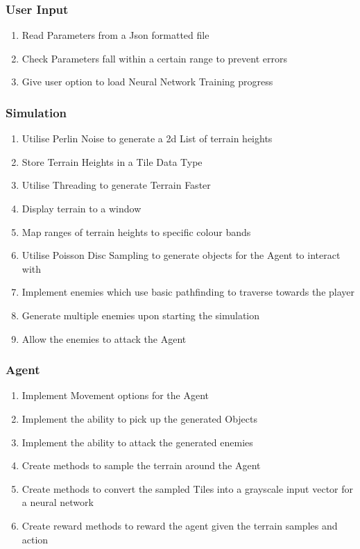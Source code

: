 \begin{flushleft}
            \subsubsection*{User Input}
                \begin{enumerate}
                    \item Read Parameters from a Json formatted file
                    \item Check Parameters fall within a certain range to prevent errors
                    \item Give user option to load Neural Network Training progress
                \end{enumerate}
            \subsubsection*{Simulation}
                \begin{enumerate}
                    \item Utilise Perlin Noise to generate a 2d List of terrain heights
                    \item Store Terrain Heights in a Tile Data Type
                    \item Utilise Threading to generate Terrain Faster
                    \item Display terrain to a window
                    \item Map ranges of terrain heights to specific colour bands
                    \item Utilise Poisson Disc Sampling to generate objects for the Agent to interact with
                    \item Implement enemies which use basic pathfinding to traverse towards the player
                    \item Generate multiple enemies upon starting the simulation
                    \item Allow the enemies to attack the Agent
                \end{enumerate}   
            \subsubsection*{Agent}
                \begin{enumerate}
                    \item Implement Movement options for the Agent
                    \item Implement the ability to pick up the generated Objects
                    \item Implement the ability to attack the generated enemies
                    \item Create methods to sample the terrain around the Agent
                    \item Create methods to convert the sampled Tiles into a grayscale input vector for a neural network
                    \item Create reward methods to reward the agent given the terrain samples and action
                \end{enumerate}   

\end{flushleft}
